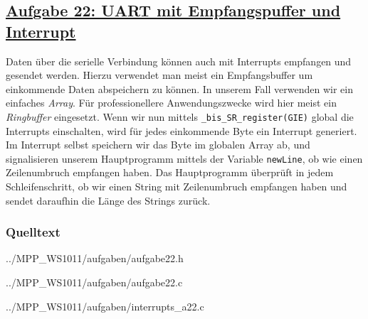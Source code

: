 \subsection
{\href{http://cst.mi.fu-berlin.de/intern/19606-P-MPP/Aufgaben/040703.html}
{Aufgabe 22: UART mit Empfangspuffer und Interrupt}}

Daten über die serielle Verbindung können auch mit Interrupts empfangen und gesendet werden.
Hierzu verwendet man meist ein Empfangsbuffer um einkommende Daten abspeichern zu können.
In unserem Fall verwenden wir ein einfaches \textit{Array}.
Für professionellere Anwendungszwecke wird hier meist ein \textit{Ringbuffer} eingesetzt.
Wenn wir nun mittels \texttt{\_bis\_SR\_register(GIE)} global die Interrupts einschalten,
wird für jedes einkommende Byte ein Interrupt generiert.
Im Interrupt selbst speichern wir das Byte im globalen Array ab,
und signalisieren unserem Hauptprogramm mittels der Variable \texttt{newLine},
ob wie einen Zeilenumbruch empfangen haben.
Das Hauptprogramm überprüft in jedem Schleifenschritt, ob wir einen String mit Zeilenumbruch empfangen haben
und sendet daraufhin die Länge des Strings zurück. 

\subsubsection*{Quelltext}


{../MPP_WS1011/aufgaben/aufgabe22.h}


{../MPP_WS1011/aufgaben/aufgabe22.c}


{../MPP_WS1011/aufgaben/interrupts_a22.c}
